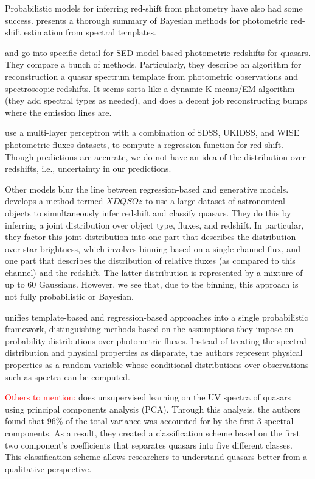 \documentclass{article}
\newcommand{\red}[1]{\textcolor{red}{#1}}
\begin{document}
Probabilistic models for inferring red-shift from photometry have also had some success.  \cite{benitez2000bayesian} presents a thorough summary of Bayesian methods for photometric red-shift estimation from spectral templates.  

\cite{budavari2001photometric} and \cite{richards2001photometric} go into specific detail for SED model based photometric redshifts for quasars.  They compare a bunch of methods. Particularly, they describe an algorithm for reconstruction a quasar spectrum template from photometric observations and spectroscopic redshifts.  It seems sorta like a dynamic K-means/EM algorithm (they add spectral types as needed), and does a decent job reconstructing bumps where the emission lines are.  

\cite{brescia2013photometric} use a multi-layer perceptron with a combination of SDSS, UKIDSS, and WISE photometric fluxes datasets, to compute a regression function for red-shift. Though predictions are accurate, we do not have an idea of the distribution over redshifts, i.e., uncertainty in our predictions.

Other models blur the line between regression-based and generative models.  \cite{bovy2012photometric} develops a method termed $XDQSOz$ to use a large dataset of astronomical objects to simultaneously infer redshift and classify quasars. They do this by inferring a joint distribution over object type, fluxes, and redshift. In particular, they factor this joint distribution
into one part that describes the distribution over star brightness, which involves binning based on a single-channel flux, and
one part that describes the distribution of relative fluxes (as compared to this channel) and the redshift. The latter distribution
is represented by a mixture of up to 60 Gaussians. However, we see that, due to the
binning, this approach is not fully probabilistic or Bayesian.


\cite{budavari2009unified} unifies template-based and regression-based
approaches into a single probabilistic framework, distinguishing methods based on the assumptions they impose on probability distributions over photometric fluxes. Instead of treating the spectral distribution and physical properties as disparate, the authors represent physical properties as a random variable whose conditional distributions over observations such as spectra can be computed.

\red{Others to mention: }
\cite{suzuki2006quasar} does unsupervised learning on the UV spectra of quasars using principal components analysis (PCA). Through this analysis, the authors found that 96\% of the total variance was accounted for by the first 3 spectral components. As a result, they created a classification scheme based on the first two component's coefficients that separates quasars into five different classes. This classification scheme allows researchers to understand quasars better from a qualitative perspective.
\end{document}
